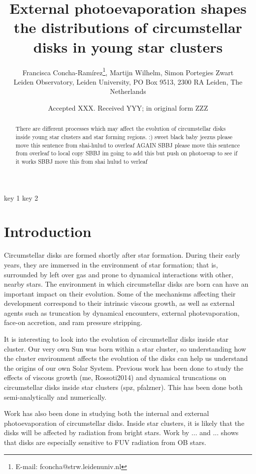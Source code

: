\documentclass[fleqn,usenatbib]{mnras}
\title[External photoevaporation of disks in young star clusters]{External photoevaporation shapes the distributions of circumstellar disks in young star clusters}
\author[Concha-Ramírez et al.]{
Francisca Concha-Ramírez\thanks{E-mail: fconcha@strw.leidenuniv.nl},
Martijn Wilhelm,
Simon Portegies Zwart
\\
Leiden Observatory, Leiden University, PO Box 9513, 2300 RA Leiden, The Netherlands\\
}
\date{Accepted XXX. Received YYY; in original form ZZZ}
\begin{document}
\label{firstpage}
\pagerange{\pageref{firstpage}--\pageref{lastpage}}
\maketitle

\begin{abstract}
There are different processes which may affect the evolution of circumstellar disks inside young star clusters and star forming regions. :)
sweet black baby jeezus please move this sentence from shai-hulud to overleaf AGAIN
SBBJ please move this sentence from overleaf to local copy
SBBJ im going to add this but push on photoevap to see if it works
SBBJ move this from shai hulud to verleaf
\end{abstract}

\begin{keywords}
key 1 key 2
\end{keywords}

\section{Introduction}
\label{sec:introduction}

Circumstellar disks are formed shortly after star formation. During their early years, they are immersed in the environment of star formation; that is, surrounded by left over gas and prone to dynamical interactions with other, nearby stars. 
The environment in which circumstellar disks are born can have an important impact on their evolution. Some of the mechanisms affecting their development correspond to their intrinsic viscous growth, as well as external agents such as truncation by dynamical encounters, external photevaporation, face-on accretion, and ram pressure stripping. 

It is interesting to look into the evolution of circumstellar disks inside star cluster. Our very own Sun was born within a star cluster, so understanding how the cluster environment affects the evolution of the disks can help us understand the origins of our own Solar System. Previous work has been done to study the effects of viscous growth (me, Rossoti2014) and dynamical truncations on circumstellar disks inside star clusters (spz, pfalzner). This has been done both semi-analytically and numerically. 

Work has also been done in studying both the internal and external photoevaporation of circumstellar disks. Inside star clusters, it is likely that the disks will be affected by radiation from bright stars. Work by ... and ... shows that disks are especially sensitive to FUV radiation from OB stars.
\end{document}
